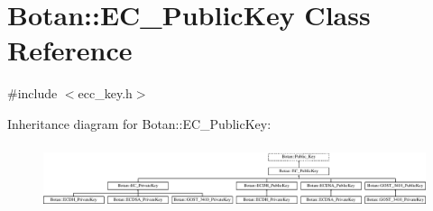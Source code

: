 \hypertarget{classBotan_1_1EC__PublicKey}{\section{Botan\-:\-:E\-C\-\_\-\-Public\-Key Class Reference}
\label{classBotan_1_1EC__PublicKey}
}


{\ttfamily \#include $<$ecc\-\_\-key.\-h$>$}

Inheritance diagram for Botan\-:\-:E\-C\-\_\-\-Public\-Key\-:\begin{figure}[H]
\begin{center}
\leavevmode
\includegraphics[height=1.904762cm]{classBotan_1_1EC__PublicKey}
\end{center}
\end{figure}
